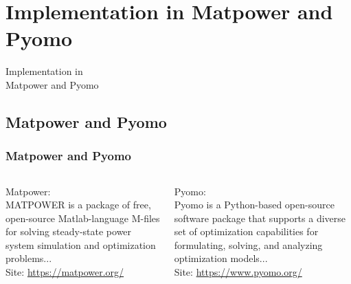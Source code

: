 \documentclass[
	11pt, %
	aspectratio=169, %
]{beamer}
\begin{document}

\section{Implementation in Matpower and Pyomo}

\begin{frame}[plain] %
	\begin{center}
		{\Huge Implementation in \\Matpower and Pyomo}
		
		\bigskip\bigskip %
		
	\end{center}
\end{frame}

\subsection{Matpower and Pyomo}
\begin{frame}
	\frametitle{Matpower and Pyomo}

	\begin{columns}
		
		\begin{column}{0.5\textwidth}
			Matpower: \\
			MATPOWER is a package of free, open-source Matlab-language M-files for solving steady-state power system simulation and optimization problems...\parencite{5491276}\\
			Site: \url{https://matpower.org/}
		\end{column}
		
		\begin{column}{0.5\textwidth}
			Pyomo:\\ Pyomo is a Python-based open-source software package that supports a diverse set of optimization capabilities for formulating, solving, and analyzing optimization models...\parencite{bynum2021pyomo}\\
			Site: \url{https://www.pyomo.org/}
		\end{column}



	\end{columns}

	
\end{frame}

\end{document}
